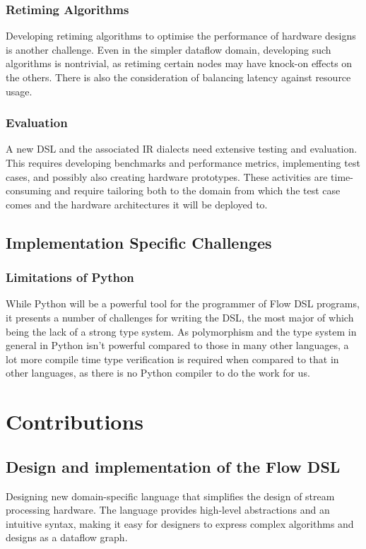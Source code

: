 \subsubsection*{Retiming Algorithms}
Developing retiming algorithms to optimise the performance of hardware designs is another challenge. Even in the simpler dataflow domain, developing such algorithms is nontrivial, as retiming certain nodes may have knock-on effects on the others. There is also the consideration of balancing latency against resource usage.
\subsubsection*{Evaluation}
A new DSL and the associated IR dialects need extensive testing and evaluation. This requires developing benchmarks and performance metrics, implementing test cases, and possibly also creating hardware prototypes. These activities are time-consuming and require tailoring both to the domain from which the test case comes and the hardware architectures it will be deployed to.

\subsection{Implementation Specific Challenges}
\subsubsection*{Limitations of Python}
While Python will be a powerful tool for the programmer of Flow DSL programs, it presents a number of challenges for writing the DSL, the most major of which being the lack of a strong type system. As polymorphism and the type system in general in Python isn't powerful compared to those in many other languages, a lot more compile time type verification is required when compared to that in other languages, as there is no Python compiler to do the work for us.

\section{Contributions}
\subsection*{Design and implementation of the Flow DSL}
Designing new domain-specific language that simplifies the design of stream processing hardware. The language provides high-level abstractions and an intuitive syntax, making it easy for designers to express complex algorithms and designs as a dataflow graph.

